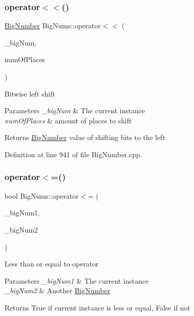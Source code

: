 \subsubsection{\texorpdfstring{operator$<$$<$()}{operator<<()}\hspace{0.1cm}{\footnotesize\ttfamily [2/2]}}
{\footnotesize\ttfamily \mbox{\hyperlink{class_big_nums_1_1_big_number}{Big\+Number}} Big\+Nums\+::operator$<$$<$ (\begin{DoxyParamCaption}\item[{const \mbox{\hyperlink{class_big_nums_1_1_big_number}{Big\+Number}} \&}]{\+\_\+big\+Num,  }\item[{int}]{num\+Of\+Places }\end{DoxyParamCaption})}

Bitwise left shift 
\begin{DoxyParams}{Parameters}
{\em \+\_\+big\+Num} & The current instance \\
\hline
{\em num\+Of\+Places} & amount of places to shift \\
\hline
\end{DoxyParams}
\begin{DoxyReturn}{Returns}
\mbox{\hyperlink{class_big_nums_1_1_big_number}{Big\+Number}} value of shifting bits to the left 
\end{DoxyReturn}


Definition at line 941 of file Big\+Number.\+cpp.

\mbox{\label{namespace_big_nums_a60e44068f20ee7b59d24f7147282eb2c}} 
\subsubsection{\texorpdfstring{operator$<$=()}{operator<=()}}
{\footnotesize\ttfamily bool Big\+Nums\+::operator$<$= (\begin{DoxyParamCaption}\item[{const \mbox{\hyperlink{class_big_nums_1_1_big_number}{Big\+Number}} \&}]{\+\_\+big\+Num1,  }\item[{const \mbox{\hyperlink{class_big_nums_1_1_big_number}{Big\+Number}} \&}]{\+\_\+big\+Num2 }\end{DoxyParamCaption})}

Less than or equal to operator 
\begin{DoxyParams}{Parameters}
{\em \+\_\+big\+Num1} & The current instance \\
\hline
{\em \+\_\+big\+Num2} & Another \mbox{\hyperlink{class_big_nums_1_1_big_number}{Big\+Number}} \\
\hline
\end{DoxyParams}
\begin{DoxyReturn}{Returns}
True if current instance is less or equal, False if not 
\end{DoxyReturn}


